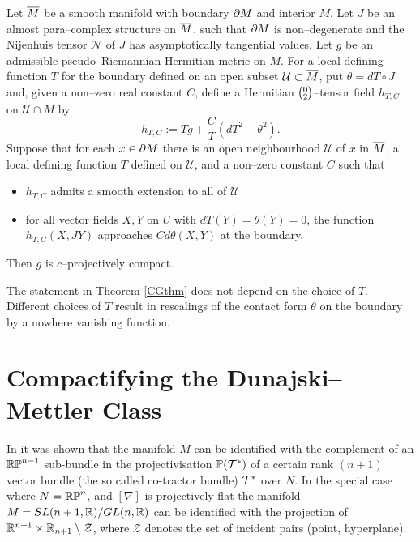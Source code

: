 \begin{theo}[\cite{CG}] \label{CGthm}
Let $\overline{M}$ be a smooth manifold with boundary $\partial M$ and interior $M$. Let $J$ be an almost para--complex structure on $\overline{M}$, such that $\partial M$ is non--degenerate and the Nijenhuis tensor $\mathcal{N}$ of $J$ has asymptotically tangential values. Let $g$ be an admissible pseudo--Riemannian Hermitian metric on $M$. For a local defining function $T$ for the boundary defined on an open 
subset ${\mathcal U}\subset \overline{M}$, put $\theta=dT\circ J$ and, given a non--zero real 
constant $C$, define a Hermitian $\big(\negthinspace\begin{smallmatrix}
0 \\ 2
\end{smallmatrix}\negthinspace\big)$--tensor field $h_{T,C}$ on 
${\mathcal U}\cap M$ by
\[
h_{T,C}:=Tg+\frac{C}{T}(dT^2-\theta^2).
\]
Suppose that for each $x\in\partial M$ there is an open neighbourhood 
${\mathcal{U}}$ of $x$ in $\overline{M}$, a local defining function $T$ defined on 
${\mathcal{U}}$, and a non--zero constant $C$ such that
\begin{itemize}
\item $h_{T,C}$ admits a smooth extension to all of $\mathcal{U}$
\item for all vector fields $X,Y$ on $U$ with $dT(Y)=\theta(Y)=0$, the function $h_{T,C}(X,JY)$ approaches $Cd\theta(X,Y)$ at the boundary.
\end{itemize}
Then $g$ is $c$--projectively compact.
\end{theo}
The statement in  Theorem \ref{CGthm} does not depend on the choice of $T$. Different choices of $T$ result in rescalings of the contact form $\theta$ on the boundary by a nowhere vanishing function.


\section{Compactifying the Dunajski--Mettler Class} 
\label{section_4}
\newcommand{\ol}[1]{\overline{#1}} \newcommand{\bp}{\boldsymbol{p}}

In \cite{DM} it was shown that the manifold $M$ can be identified with the
complement of
an $\mathbb{RP}^{n-1}$ sub-bundle in the  projectivisation $\mathbb{P}(\mathcal{T}^*)$ of a certain rank $(n+1)$ vector bundle (the so called co-tractor bundle) $\mathcal{T}^*$  
over $N$. In the special case where $N=\mathbb{RP}^n$, and $[\nabla]$ is projectively 
flat the manifold $M=SL(n+1, \mathbb{R})/GL(n, \mathbb{R})$ can be identified with the projection of $\mathbb{R}^{n+1}\times \mathbb{R}_{n+1}\setminus {\mathcal Z}$, where ${\mathcal Z}$ denotes the set
of incident pairs (point, hyperplane).

